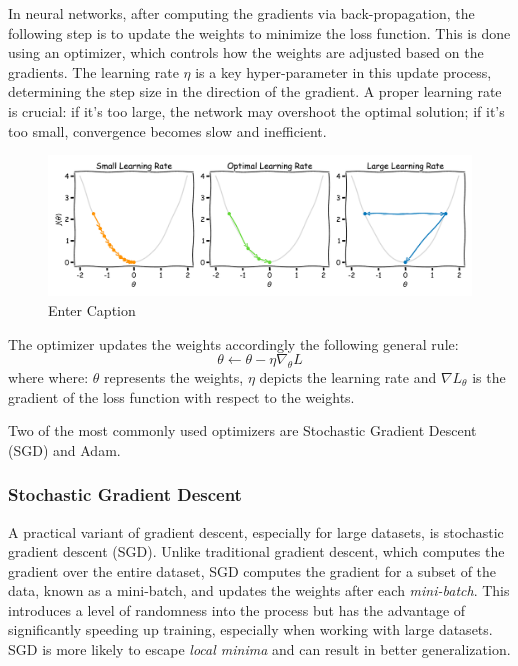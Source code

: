 In neural networks, after computing the gradients via back-propagation, the following step is to update the weights to minimize the loss function. This is done using an optimizer, which controls how the weights are adjusted based on the gradients. The learning rate $\eta$ is a key hyper-parameter in this update process, determining the step size in the direction of the gradient. 
A proper learning rate is crucial: if it's too large, the network may overshoot the optimal solution; if it's too small, convergence becomes slow and inefficient.
\begin{figure}[H]
    \centering
    \includegraphics[width=1\linewidth]{LateX//figs/learning_rate.pdf}
    \caption{Enter Caption}
    \label{fig:enter-label}
\end{figure}

The optimizer updates the weights accordingly the following general rule:
\begin{equation}
    \theta \leftarrow \theta - \eta \nabla_\theta L
\end{equation}
where where: $\theta$ represents the weights, $\eta$ depicts the learning rate and $\nabla L_\theta$ is the gradient of the loss function with respect to the weights. 

Two of the most commonly used optimizers are Stochastic Gradient Descent (SGD) and Adam.

\subsubsection*{Stochastic Gradient Descent}
A practical variant of gradient descent, especially for large datasets, is stochastic gradient descent (SGD). Unlike traditional gradient descent, which computes the gradient over the entire dataset, SGD computes the gradient for a subset of the data, known as a mini-batch, and updates the weights after each \textit{mini-batch}. This introduces a level of randomness into the process but has the advantage of significantly speeding up training, especially when working with large datasets. SGD is more likely to escape \textit{local minima} and can result in better generalization.

